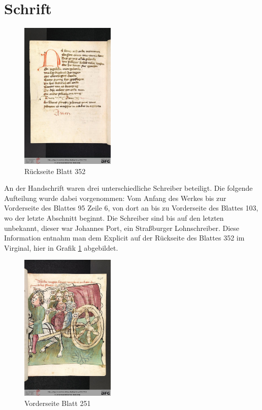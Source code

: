 \documentclass[a4paper, 12pt, oneside]{scrbook}
\begin{document}
\section{Schrift}
\begin{figure}
	\vspace{-40pt}
	\centering
	\includegraphics[width=0.4\textwidth]{0722.jpg}
	\caption{Rückseite Blatt 352\cite{virginal352v}}
	\label{fig:1}
\end{figure}

An der Handschrift waren drei unterschiedliche Schreiber beteiligt. Die folgende Aufteilung wurde dabei vorgenommen: Vom Anfang des Werkes bis zur Vorderseite des Blattes 95 Zeile 6, von dort an bis zu Vorderseite des Blattes 103, wo der letzte Abschnitt beginnt. Die Schreiber sind bis auf den letzten unbekannt, dieser war Johannes Port, ein Straßburger Lohnschreiber. Diese Information entnahm man dem Explicit auf der Rückseite des Blattes 352 im Virginal, hier in Grafik \ref{fig:1} abgebildet.

\begin{figure}
	\centering
	\includegraphics[width=0.4\textwidth]{0519.jpg}
	\caption{Vorderseite Blatt 251\cite{virginal251r}}
	\label{fig:2}
\end{figure}
\end{document}
